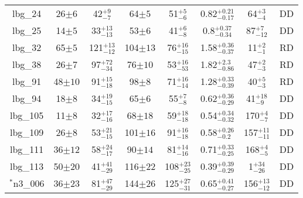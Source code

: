 \documentclass[fleqn,usenatbib]{mn2e}
\begin{document}
\begin{table*}
\begin{threeparttable}
\begin{tabular}{cccccccc}
lbg\_24         & 26$\pm6$                    & 42$^{+9}_{-7}$                     & 64$\pm5$                  & 51$^{+5}_{-6}$           & 0.82$^{+0.21}_{-0.17}$          & 64$^{+3}_{-4}$ & DD   \\
lbg\_25         & 14$\pm5$                    & 33$^{+13}_{-13}$                     & 53$\pm6$                  & 41$^{+6}_{-8}$         & 0.8$^{+0.37}_{-0.34}$                  & 87$^{+7}_{-12}$  & DD   \\
lbg\_32         & 65$\pm5$                    & 121$^{+13}_{-12}$                    & 104$\pm13$                 & 76$^{+16}_{-15}$       & 1.58$^{+0.36}_{-0.37}$               & 11$^{+2}_{-1}$ & RD \\
lbg\_38         & 26$\pm7$                    & 97$^{+72}_{-34}$                     & 76$\pm10$                  & 53$^{+16}_{-53}$       & 1.82$^{+2.3}_{-0.86}$               & 47$^{+2}_{-3}$  & RD   \\
lbg\_91         & 48$\pm10$                    & 91$^{+15}_{-18}$                     & 98$\pm8$                  & 71$^{+16}_{-14}$        & 1.28$^{+0.33}_{-0.39}$              & 40$^{+5}_{-3}$  & RD  \\
lbg\_94         & 18$\pm8$                    & 34$^{+19}_{-15}$                     & 65$\pm6$                  & 55$^{+7}_{-8}$         & 0.62$^{+0.36}_{-0.29}$                & 41$^{+18}_{-9}$  & DD  \\
lbg\_105        & 11$\pm8$                    & 32$^{+17}_{-16}$                     & 68$\pm18$                  & 59$^{+18}_{-18}$        & 0.54$^{+0.34}_{-0.32}$                & 170$^{+4}_{-7}$ & DD  \\
lbg\_109        & 26$\pm8$                    & 53$^{+21}_{-15}$                     & 101$\pm16$                 & 91$^{+16}_{-18}$      & 0.58$^{+0.26}_{-0.2}$                & 157$^{+11}_{-11}$ & DD  \\
lbg\_111        & 36$\pm12$         & 58$^{+24}_{-17}$                     & 90$\pm14$                  & 81$^{+14}_{-16}$                   & 0.71$^{+0.33}_{-0.25}$                 & 168$^{+4}_{-5}$ & DD  \\
lbg\_113        & 50$\pm20$           & 41$^{+41}_{-29}$                     & 116$\pm22$                 & 108$^{+23}_{-25}$                  & 0.39$^{+0.39}_{-0.29}$                & 1$^{+34}_{-26}$  & DD   \\
$^{*}$n3\_006         & 36$\pm23$                    & 81$^{+47}_{-29}$                     & 144$\pm26$                 & 125$^{+27}_{-31}$          & 0.65$^{+0.41}_{-0.27}$                & 156$^{+13}_{-12}$ & DD   \\

\end{tabular}
\end{threeparttable}
\end{table*}
\end{document}
